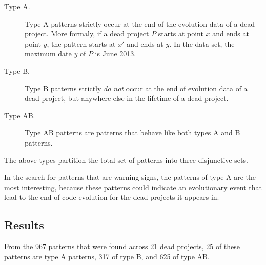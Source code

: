 \begin{description}
	\item[Type A.] Type A patterns strictly occur at the end of the evolution data
		of a dead project. More formaly, if a dead project $P$ starts at point $x$ and
		ends at point $y$, the pattern starts at $x'$ and ends at $y$. In the data
		set, the maximum date $y$ of $P$ is June 2013.
	
	\item[Type B.] Type B patterns strictly \emph{do not }\rm occur at the end of
		evolution data of a dead project, but anywhere else in the lifetime of a dead
		project.
	
	\item[Type AB.] Type AB patterns are patterns that behave like both types A and
		B patterns.
\end{description}

\noindent
The above types partition the total set of patterns into three disjunctive sets.

In the search for patterns that are warning signs, the patterns of type A are
the most interesting, because these patterns could indicate an evolutionary
event that lead to the end of code evolution for the dead projects it appears
in.

\subsection{Results}
From the 967 patterns that were found across 21 dead projects, 25 of these
patterns are type A patterns, 317 of type B, and 625 of type AB.


\begin{comment}
- Execution of the research
- Phases, steps

This chapter reports on the execution of the research method as described in Chapter 3.

If the research has been divided into phases (e.g., using sub questions) the
phases are introduced, reported on and concluded individually. If needed this
Chapter could be split up to balance out the sizes of all Chapters.
An example Research Chapter is provided as Chapter 3 at Paul’s home
page\footnote{http://homepages.cwi.nl/~paulk/thesesMasterSoftwareEngineering/2006/ReneWiegers.pdf}.
\end{comment}
